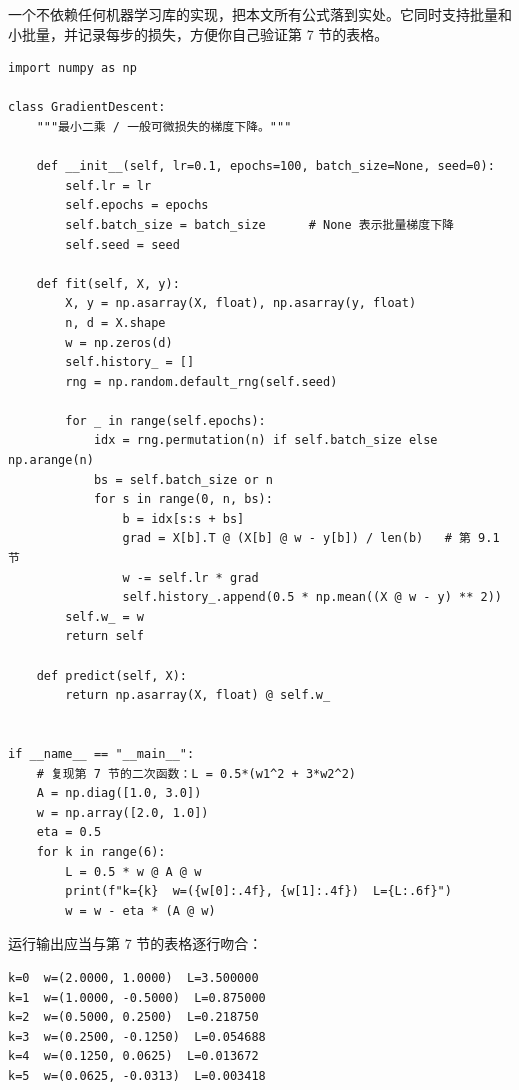 \documentclass[UTF8, a4paper, zihao=-4, fontset=none]{ctexart}
\begin{document}
一个不依赖任何机器学习库的实现，把本文所有公式落到实处。它同时支持批量和小批量，并记录每步的损失，方便你自己验证第 7 节的表格。



\noindent\begin{minipage}{\linewidth}
\begin{lstlisting}[basicstyle=\ttfamily\scriptsize,aboveskip=6pt]
import numpy as np

class GradientDescent:
    """最小二乘 / 一般可微损失的梯度下降。"""

    def __init__(self, lr=0.1, epochs=100, batch_size=None, seed=0):
        self.lr = lr
        self.epochs = epochs
        self.batch_size = batch_size      # None 表示批量梯度下降
        self.seed = seed

    def fit(self, X, y):
        X, y = np.asarray(X, float), np.asarray(y, float)
        n, d = X.shape
        w = np.zeros(d)
        self.history_ = []
        rng = np.random.default_rng(self.seed)

        for _ in range(self.epochs):
            idx = rng.permutation(n) if self.batch_size else np.arange(n)
            bs = self.batch_size or n
            for s in range(0, n, bs):
                b = idx[s:s + bs]
                grad = X[b].T @ (X[b] @ w - y[b]) / len(b)   # 第 9.1 节
                w -= self.lr * grad
                self.history_.append(0.5 * np.mean((X @ w - y) ** 2))
        self.w_ = w
        return self

    def predict(self, X):
        return np.asarray(X, float) @ self.w_


if __name__ == "__main__":
    # 复现第 7 节的二次函数：L = 0.5*(w1^2 + 3*w2^2)
    A = np.diag([1.0, 3.0])
    w = np.array([2.0, 1.0])
    eta = 0.5
    for k in range(6):
        L = 0.5 * w @ A @ w
        print(f"k={k}  w=({w[0]:.4f}, {w[1]:.4f})  L={L:.6f}")
        w = w - eta * (A @ w)
\end{lstlisting}
\end{minipage}



运行输出应当与第 7 节的表格逐行吻合：



\noindent\begin{minipage}{\linewidth}
\begin{lstlisting}[basicstyle=\ttfamily\scriptsize,aboveskip=6pt]
k=0  w=(2.0000, 1.0000)  L=3.500000
k=1  w=(1.0000, -0.5000)  L=0.875000
k=2  w=(0.5000, 0.2500)  L=0.218750
k=3  w=(0.2500, -0.1250)  L=0.054688
k=4  w=(0.1250, 0.0625)  L=0.013672
k=5  w=(0.0625, -0.0313)  L=0.003418
\end{lstlisting}
\end{minipage}
\end{document}
